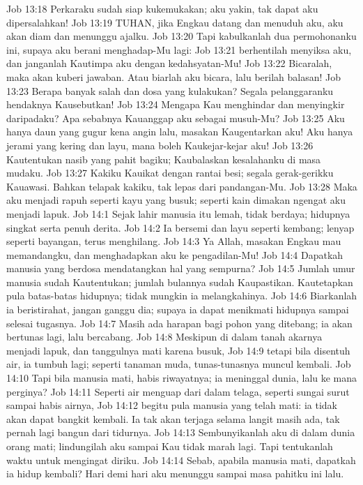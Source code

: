 Job 13:18  Perkaraku sudah siap kukemukakan; aku yakin, tak dapat aku dipersalahkan!
Job 13:19  TUHAN, jika Engkau datang dan menuduh aku, aku akan diam dan menunggu ajalku.
Job 13:20  Tapi kabulkanlah dua permohonanku ini, supaya aku berani menghadap-Mu lagi:
Job 13:21  berhentilah menyiksa aku, dan janganlah Kautimpa aku dengan kedahsyatan-Mu!
Job 13:22  Bicaralah, maka akan kuberi jawaban. Atau biarlah aku bicara, lalu berilah balasan!
Job 13:23  Berapa banyak salah dan dosa yang kulakukan? Segala pelanggaranku hendaknya Kausebutkan!
Job 13:24  Mengapa Kau menghindar dan menyingkir daripadaku? Apa sebabnya Kauanggap aku sebagai musuh-Mu?
Job 13:25  Aku hanya daun yang gugur kena angin lalu, masakan Kaugentarkan aku! Aku hanya jerami yang kering dan layu, mana boleh Kaukejar-kejar aku!
Job 13:26  Kautentukan nasib yang pahit bagiku; Kaubalaskan kesalahanku di masa mudaku.
Job 13:27  Kakiku Kauikat dengan rantai besi; segala gerak-gerikku Kauawasi. Bahkan telapak kakiku, tak lepas dari pandangan-Mu.
Job 13:28  Maka aku menjadi rapuh seperti kayu yang busuk; seperti kain dimakan ngengat aku menjadi lapuk.
Job 14:1  Sejak lahir manusia itu lemah, tidak berdaya; hidupnya singkat serta penuh derita.
Job 14:2  Ia bersemi dan layu seperti kembang; lenyap seperti bayangan, terus menghilang.
Job 14:3  Ya Allah, masakan Engkau mau memandangku, dan menghadapkan aku ke pengadilan-Mu!
Job 14:4  Dapatkah manusia yang berdosa mendatangkan hal yang sempurna?
Job 14:5  Jumlah umur manusia sudah Kautentukan; jumlah bulannya sudah Kaupastikan. Kautetapkan pula batas-batas hidupnya; tidak mungkin ia melangkahinya.
Job 14:6  Biarkanlah ia beristirahat, jangan ganggu dia; supaya ia dapat menikmati hidupnya sampai selesai tugasnya.
Job 14:7  Masih ada harapan bagi pohon yang ditebang; ia akan bertunas lagi, lalu bercabang.
Job 14:8  Meskipun di dalam tanah akarnya menjadi lapuk, dan tanggulnya mati karena busuk,
Job 14:9  tetapi bila disentuh air, ia tumbuh lagi; seperti tanaman muda, tunas-tunasnya muncul kembali.
Job 14:10  Tapi bila manusia mati, habis riwayatnya; ia meninggal dunia, lalu ke mana perginya?
Job 14:11  Seperti air menguap dari dalam telaga, seperti sungai surut sampai habis airnya,
Job 14:12  begitu pula manusia yang telah mati: ia tidak akan dapat bangkit kembali. Ia tak akan terjaga selama langit masih ada, tak pernah lagi bangun dari tidurnya.
Job 14:13  Sembunyikanlah aku di dalam dunia orang mati; lindungilah aku sampai Kau tidak marah lagi. Tapi tentukanlah waktu untuk mengingat diriku.
Job 14:14  Sebab, apabila manusia mati, dapatkah ia hidup kembali? Hari demi hari aku menunggu sampai masa pahitku ini lalu.

